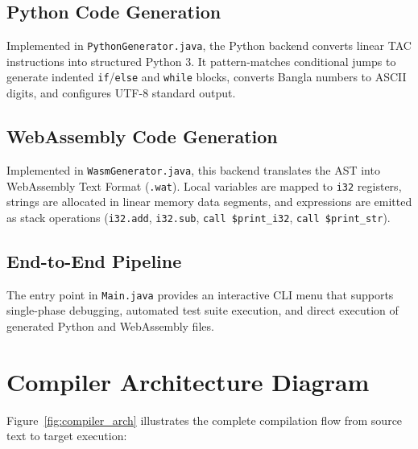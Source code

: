 \documentclass[12pt, a4paper]{report}
\begin{document}
\section{Python Code Generation}
Implemented in \texttt{PythonGenerator.java}, the Python backend converts linear TAC instructions into structured Python 3. It pattern-matches conditional jumps to generate indented \texttt{if}/\texttt{else} and \texttt{while} blocks, converts Bangla numbers to ASCII digits, and configures UTF-8 standard output.

\section{WebAssembly Code Generation}
Implemented in \texttt{WasmGenerator.java}, this backend translates the AST into WebAssembly Text Format (\texttt{.wat}). Local variables are mapped to \texttt{i32} registers, strings are allocated in linear memory data segments, and expressions are emitted as stack operations (\texttt{i32.add}, \texttt{i32.sub}, \texttt{call \$print\_i32}, \texttt{call \$print\_str}).

\section{End-to-End Pipeline}
The entry point in \texttt{Main.java} provides an interactive CLI menu that supports single-phase debugging, automated test suite execution, and direct execution of generated Python and WebAssembly files.

\chapter{Compiler Architecture Diagram}

Figure~\ref{fig:compiler_arch} illustrates the complete compilation flow from source text to target execution:
\end{document}
